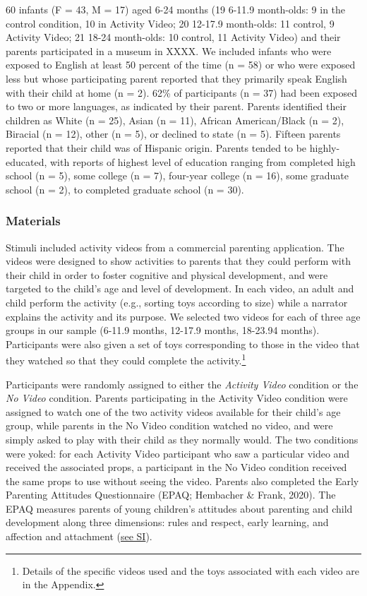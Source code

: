 \documentclass[
  english,
  man]{apa6}
\begin{document}
60 infants (F = 43, M = 17) aged 6-24 months (19 6-11.9 month-olds: 9 in the control condition, 10 in Activity Video; 20 12-17.9 month-olds: 11 control, 9 Activity Video; 21 18-24 month-olds: 10 control, 11 Activity Video) and their parents participated in a museum in XXXX.
We included infants who were exposed to English at least 50 percent of the time (n = 58) or who were exposed less but whose participating parent reported that they primarily speak English with their child at home (n = 2).
62\% of participants (n = 37) had been exposed to two or more languages, as indicated by their parent.
Parents identified their children as White (n = 25), Asian (n = 11), African American/Black (n = 2), Biracial (n = 12), other (n = 5), or declined to state (n = 5).
Fifteen parents reported that their child was of Hispanic origin.
Parents tended to be highly-educated, with reports of highest level of education ranging from completed high school (n = 5), some college (n = 7), four-year college (n = 16), some graduate school (n = 2), to completed graduate school (n = 30).

\hypertarget{materials}{%
\subsubsection{Materials}\label{materials}}

Stimuli included activity videos from a commercial parenting application.
The videos were designed to show activities to parents that they could perform with their child in order to foster cognitive and physical development, and were targeted to the child's age and level of development.
In each video, an adult and child perform the activity (e.g., sorting toys according to size) while a narrator explains the activity and its purpose.
We selected two videos for each of three age groups in our sample (6-11.9 months, 12-17.9 months, 18-23.94 months).
Participants were also given a set of toys corresponding to those in the video that they watched so that they could complete the activity.\footnote{Details of the specific videos used and the toys associated with each video are in the Appendix.}

Participants were randomly assigned to either the \emph{Activity Video} condition or the \emph{No Video} condition.
Parents participating in the Activity Video condition were assigned to watch one of the two activity videos available for their child's age group, while parents in the No Video condition watched no video, and were simply asked to play with their child as they normally would.
The two conditions were yoked: for each Activity Video participant who saw a particular video and received the associated props, a participant in the No Video condition received the same props to use without seeing the video.
Parents also completed the Early Parenting Attitudes Questionnaire (EPAQ; Hembacher \& Frank, 2020).
The EPAQ measures parents of young children's attitudes about parenting and child development along three dimensions: rules and respect, early learning, and affection and attachment (\href{XXX}{see SI}).
\end{document}
